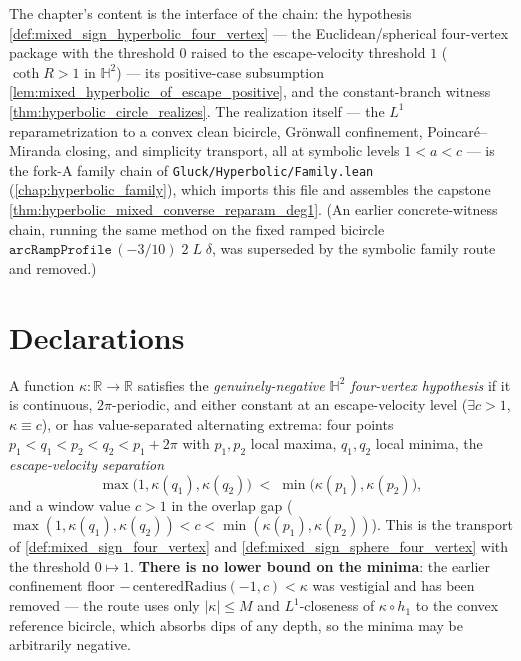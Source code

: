 The chapter's content is the interface of the chain: the hypothesis
\cref{def:mixed_sign_hyperbolic_four_vertex} — the Euclidean/spherical
four-vertex package with the threshold $0$ raised to the escape-velocity
threshold $1$ ($\coth R>1$ in $\mathbb H^2$) — its positive-case subsumption
\cref{lem:mixed_hyperbolic_of_escape_positive}, and the constant-branch
witness \cref{thm:hyperbolic_circle_realizes}. The realization itself — the
$L^1$ reparametrization to a convex clean bicircle, Grönwall confinement,
Poincaré–Miranda closing, and simplicity transport, all at symbolic levels
$1<a<c$ — is the fork-A family chain of \texttt{Gluck/Hyperbolic/Family.lean}
(\cref{chap:hyperbolic_family}), which imports this file and assembles the
capstone \cref{thm:hyperbolic_mixed_converse_reparam_deg1}. (An earlier
concrete-witness chain, running the same method on the fixed ramped bicircle
$\texttt{arcRampProfile}\,(-3/10)\;2\;L\;\delta$, was superseded by the
symbolic family route and removed.)

\section{Declarations}

\begin{definition}
  \label{def:mixed_sign_hyperbolic_four_vertex}
  A function $\kappa:\mathbb R\to\mathbb R$ satisfies the
  \emph{genuinely-negative $\mathbb H^2$ four-vertex hypothesis} if it is
  continuous, $2\pi$-periodic, and either constant at an escape-velocity level
  ($\exists c>1$, $\kappa\equiv c$), or has value-separated alternating
  extrema: four points $p_1<q_1<p_2<q_2<p_1+2\pi$ with $p_1,p_2$ local maxima,
  $q_1,q_2$ local minima, the \emph{escape-velocity separation}
  \[
    \max\bigl(1,\kappa(q_1),\kappa(q_2)\bigr)\;<\;
    \min\bigl(\kappa(p_1),\kappa(p_2)\bigr),
  \]
  and a window value $c>1$ in the overlap gap
  ($\max(1,\kappa(q_1),\kappa(q_2))<c<\min(\kappa(p_1),\kappa(p_2))$). This is
  the transport of \cref{def:mixed_sign_four_vertex} and
  \cref{def:mixed_sign_sphere_four_vertex} with the threshold $0\mapsto1$.
  \textbf{There is no lower bound on the minima}: the earlier confinement
  floor $-\,\mathrm{centeredRadius}(-1,c)<\kappa$ was vestigial and has been
  removed — the route uses only $|\kappa|\le M$ and $L^1$-closeness of
  $\kappa\circ h_1$ to the convex reference bicircle, which absorbs dips of
  any depth, so the minima may be arbitrarily negative.
\end{definition}

